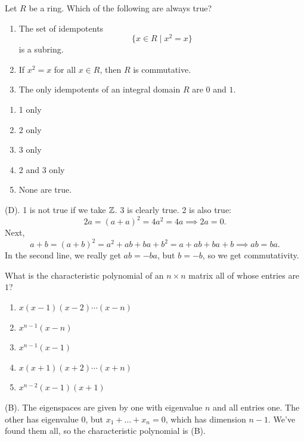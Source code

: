\begin{exercise}
Let $R$ be a ring. Which of the following are always true?
\begin{enumerate}
    \item The set of idempotents
    \[
    \{x\in R\mid x^2=x\}
    \]
    is a subring.

    \item If $x^2=x$ for all $x\in R$, then $R$ is commutative.

    \item The only idempotents of an integral domain $R$ are $0$ and $1$.
\end{enumerate}
\begin{enumerate}[label=\alph*)]
    \item 1 only
    \item 2 only
    \item 3 only
    \item 2 and 3 only
    \item None are true.
\end{enumerate}
\end{exercise}
\begin{solution}
(D). 1 is not true if we take $\mathbb{Z}$. 3 is clearly true. 2 is also true:
\[
2a = (a + a)^2 = 4a^2 = 4a \implies 2a = 0.
\]
Next,
\[
a + b = (a + b)^2 = a^2 + ab + ba + b^2 = a + ab + ba + b \implies ab = ba.
\]
In the second line, we really get $ab = -ba$, but $b = -b$, so we get commutativity.
\end{solution}

\begin{exercise}
What is the characteristic polynomial of an $n\times n$ matrix all of whose entries are $1$?
\begin{enumerate}[label=(\Alph*)]
    \item $x(x-1)(x-2)\cdots(x-n)$
    \item $x^{n-1}(x-n)$
    \item $x^{n-1}(x-1)$
    \item $x(x+1)(x+2)\cdots(x+n)$
    \item $x^{n-2}(x-1)(x+1)$
\end{enumerate}
\end{exercise}
\begin{solution}
(B). The eigenspaces are given by one with eigenvalue $n$ and all entries one. The other 
has eigenvalue $0$, but $x_1 + \dots + x_n = 0$, which has dimension $n - 1$. We've found them all, so 
the characteristic polynomial is (B).
\end{solution}

